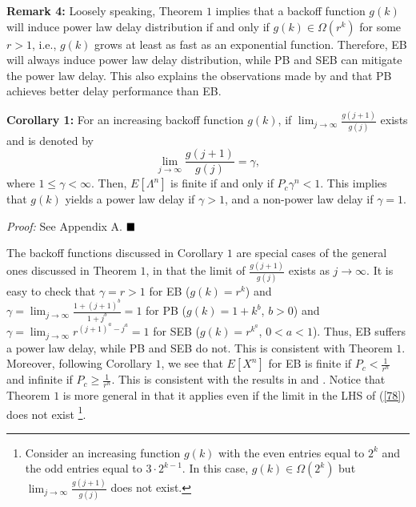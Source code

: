 \documentclass[journal]{IEEEtran}
\begin{document}
\textbf{Remark 4:} Loosely speaking, Theorem $1$ implies that a backoff function $g(k)$ will induce power law delay distribution if and only if $g(k)\in \Omega\left(r^k\right)$ for some $r>1$, i.e., $g(k)$ grows at least as fast as an exponential function. Therefore, EB will always induce power law delay distribution, while PB and SEB can mitigate the power law delay. This also explains the observations made by \cite{2008:Xu} and \cite{2011:Sun} that PB achieves better delay performance than EB.

\textbf{Corollary 1:} For an increasing backoff function $g(k)$, if $\lim_{j\rightarrow \infty} \frac{g(j+1)}{g(j)}$ exists and is denoted by
\begin{equation}
\label{78}
\lim_{j\rightarrow \infty} \frac{g(j+1)}{g(j)} = \gamma,
\end{equation}
where $1\leq \gamma<\infty$. Then, $E\left[\Lambda^n\right]$ is finite if and only if $P_c \gamma^n <1$. This implies that $g(k)$ yields a power law delay if $\gamma>1$, and a non-power law delay if $\gamma=1$.

\emph{Proof:} See Appendix A.  $\hfill \blacksquare$

The backoff functions discussed in Corollary $1$ are special cases of the general ones discussed in Theorem $1$, in that the limit of $\frac{g(j+1)}{g(j)}$ exists as $j\rightarrow \infty$. It is easy to check that $\gamma=r>1$ for EB ($g(k)=r^k$) and $\gamma=\lim_{j\rightarrow \infty} \frac{1+(j+1)^b}{1+j^b} = 1$ for PB ($g(k)=1+k^b$, $b>0$) and $\gamma = \lim_{j\rightarrow \infty} r^{(j+1)^a-j^a} = 1$ for SEB ($g(k)= r^{k^a}$, $0<a<1$). Thus, EB suffers a power law delay, while PB and SEB do not. This is consistent with Theorem $1$. Moreover, following Corollary $1$, we see that $E[X^n]$ for EB is finite if $P_c < \frac{1}{r^n}$ and infinite if $P_c \geq \frac{1}{r^n}$. This is consistent with the results in \cite{2009:Cho} and \cite{2007:Sakurai}. Notice that Theorem $1$ is more general in that it applies even if the limit in the LHS of (\ref{78}) does not exist \footnote{Consider an increasing function $g(k)$ with the even entries equal to $2^k$ and the odd entries equal to $3\cdot 2^{k-1}$. In this case, $g(k)\in\Omega\left(2^k\right)$ but $\lim_{j\rightarrow \infty} \frac{g(j+1)}{g(j)}$ does not exist.}.
\end{document}
